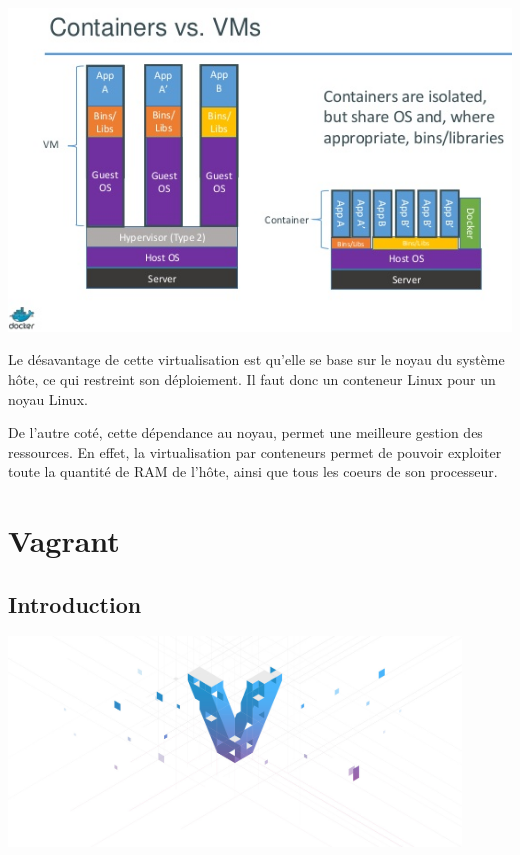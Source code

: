\documentclass[12pt,a4paper]{article}
\begin{document}
\begin{center}
  \includegraphics[width=15cm]{images_rapport/vm_container.jpg}
\end{center}

Le désavantage de cette virtualisation est qu'elle se base sur le noyau du système hôte, ce qui restreint son déploiement. Il faut donc un conteneur Linux pour un noyau Linux. 

De l'autre coté, cette dépendance au noyau, permet une meilleure gestion des ressources. En effet, la virtualisation par conteneurs permet de pouvoir exploiter toute la quantité de RAM de l'hôte, ainsi que tous les coeurs de son processeur.

\section{Vagrant}

\subsection{Introduction}
\begin{center}
  \includegraphics[width=12cm]{images_rapport/vagrant_logo.jpg}
\end{center}
\end{document}
